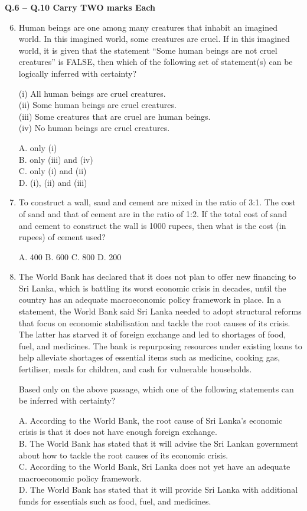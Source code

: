 \documentclass[journal,12pt,onecolumn]{IEEEtran}
\begin{document}
\textbf{Q.6 -- Q.10 Carry TWO marks Each}

\begin{enumerate}
    \setcounter{enumi}{5}
    \item Human beings are one among many creatures that inhabit an imagined world. In this imagined world, some creatures are cruel. If in this imagined world, it is given that the statement “Some human beings are not cruel creatures” is FALSE, then which of the following set of statement(s) can be logically inferred with certainty?

    (i) All human beings are cruel creatures. \\
    (ii) Some human beings are cruel creatures. \\
    (iii) Some creatures that are cruel are human beings. \\
    (iv) No human beings are cruel creatures.

    A. only (i) \\
    B. only (iii) and (iv) \\
    C. only (i) and (ii) \\
    D. (i), (ii) and (iii)

    \item To construct a wall, sand and cement are mixed in the ratio of 3:1. The cost of sand and that of cement are in the ratio of 1:2. If the total cost of sand and cement to construct the wall is 1000 rupees, then what is the cost (in rupees) of cement used?

    A. 400 \quad
    B. 600 \quad
    C. 800 \quad
    D. 200

    \item The World Bank has declared that it does not plan to offer new financing to Sri Lanka, which is battling its worst economic crisis in decades, until the country has an adequate macroeconomic policy framework in place. In a statement, the World Bank said Sri Lanka needed to adopt structural reforms that focus on economic stabilisation and tackle the root causes of its crisis. The latter has starved it of foreign exchange and led to shortages of food, fuel, and medicines. The bank is repurposing resources under existing loans to help alleviate shortages of essential items such as medicine, cooking gas, fertiliser, meals for children, and cash for vulnerable households.

    Based only on the above passage, which one of the following statements can be inferred with certainty?

    A. According to the World Bank, the root cause of Sri Lanka’s economic crisis is that it does not have enough foreign exchange. \\
    B. The World Bank has stated that it will advise the Sri Lankan government about how to tackle the root causes of its economic crisis. \\
    C. According to the World Bank, Sri Lanka does not yet have an adequate macroeconomic policy framework. \\
    D. The World Bank has stated that it will provide Sri Lanka with additional funds for essentials such as food, fuel, and medicines.


\end{enumerate}
\end{document}
